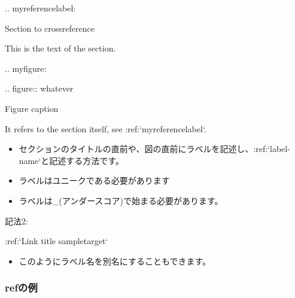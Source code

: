\documentclass[letterpaper,10pt,dvipdfmx,openany,oneside]{sphinxmanual}
\begin{document}
%
\begin{sphinxVerbatim}[commandchars=\\\{\}]
.. \PYGZus{}my\PYGZhy{}reference\PYGZhy{}label:

Section to cross\PYGZhy{}reference
\PYGZhy{}\PYGZhy{}\PYGZhy{}\PYGZhy{}\PYGZhy{}\PYGZhy{}\PYGZhy{}\PYGZhy{}\PYGZhy{}\PYGZhy{}\PYGZhy{}\PYGZhy{}\PYGZhy{}\PYGZhy{}\PYGZhy{}\PYGZhy{}\PYGZhy{}\PYGZhy{}\PYGZhy{}\PYGZhy{}\PYGZhy{}\PYGZhy{}\PYGZhy{}\PYGZhy{}\PYGZhy{}\PYGZhy{}

This is the text of the section.

.. \PYGZus{}my\PYGZhy{}figure:

.. figure:: whatever

   Figure caption

It refers to the section itself, see :ref:{}`my\PYGZhy{}reference\PYGZhy{}label{}`.
\end{sphinxVerbatim}
\begin{itemize}
\item {} 
セクションのタイトルの直前や、図の直前にラベルを記述し、:ref:{}`label-name{}`と記述する方法です。

\item {} 
ラベルはユニークである必要があります

\item {} 
ラベルは\_(アンダースコア)で始まる必要があります。

\end{itemize}

記法2:

%
\begin{sphinxVerbatim}[commandchars=\\\{\}]
:ref:{}`Link title \PYGZlt{}sample\PYGZhy{}target\PYGZgt{}{}`
\end{sphinxVerbatim}
\begin{itemize}
\item {} 
このようにラベル名を別名にすることもできます。

\end{itemize}


\subsubsection{refの例}
\label{\detokenize{source/1.chapter/roles:id1}}
{\hyperref[\detokenize{source/1.chapter/roles:sample-target}]{}}

{\hyperref[\detokenize{source/1.chapter/basic_syntax:figure-reference}]{}}
\end{document}
